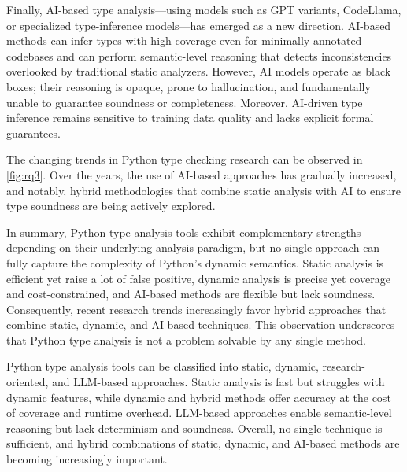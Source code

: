 Finally, AI-based type analysis—using models such as GPT variants, CodeLlama,
or specialized type-inference models—has emerged as a new direction.
AI-based methods can infer types with high coverage even for minimally
annotated codebases and can perform semantic-level reasoning that detects
inconsistencies overlooked by traditional static analyzers.
However, AI models operate as black boxes; their reasoning is opaque, prone to
hallucination, and fundamentally unable to guarantee soundness or completeness.
Moreover, AI-driven type inference remains sensitive to training data quality
and lacks explicit formal guarantees.

The changing trends in Python type checking research can be observed in
\autoref{fig:rq3}. 
Over the years, the use of AI-based approaches has gradually increased, and
notably, hybrid methodologies that combine static analysis with AI to ensure
type soundness are being actively explored.

In summary, Python type analysis tools exhibit complementary strengths
depending on their underlying analysis paradigm, but no single approach can
fully capture the complexity of Python’s dynamic semantics.
Static analysis is efficient yet raise a lot of false positive, dynamic
analysis is precise yet coverage and cost-constrained, and AI-based methods are
flexible but lack soundness.
Consequently, recent research trends increasingly favor hybrid approaches that
combine static, dynamic, and AI-based techniques.
This observation underscores that Python type analysis is not a problem
solvable by any single method.

\begin{tcolorbox}[colback=white,colframe=blue!60,title=Answer to RQ3,fonttitle=\bfseries]
  Python type analysis tools can be classified into static, dynamic,
  research-oriented, and LLM-based approaches. Static analysis is fast but
  struggles with dynamic features, while dynamic and hybrid methods offer
  accuracy at the cost of coverage and runtime overhead. LLM-based approaches
  enable semantic-level reasoning but lack determinism and soundness. Overall,
  no single technique is sufficient, and hybrid combinations of static, dynamic,
  and AI-based methods are becoming increasingly important.
\end{tcolorbox}
